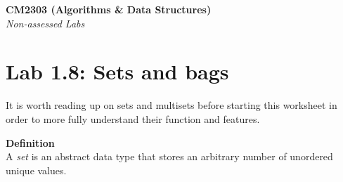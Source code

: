 \documentclass[11pt,a4paper]{report}
\begin{document}
\noindent\Large\textbf{CM2303 (Algorithms \& Data Structures)}\\
\noindent\large\textit{Non-assessed Labs}
\vskip30pt

\section*{Lab 1.8: Sets and bags}

It is worth reading up on sets and multisets before starting this worksheet in order to more fully understand their function and features.

\vskip20pt

\noindent \textbf{Definition}\\
A \textit{set} is an abstract data type that stores an arbitrary number of unordered unique values.

\vskip20pt
\end{document}

